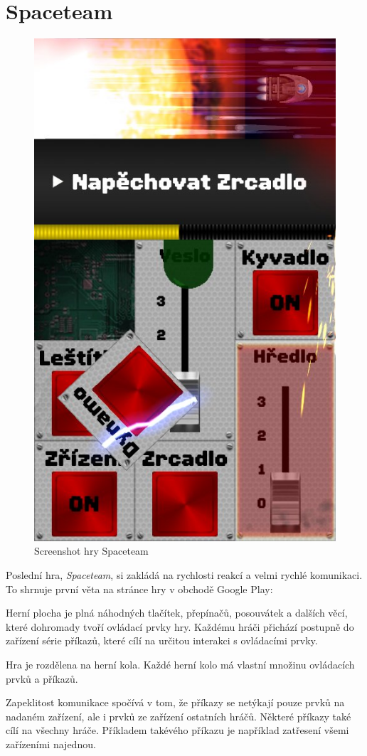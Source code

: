 \section{Spaceteam}

\begin{figure}
    \centering
    \includegraphics[width=0.5\linewidth]{assets/competitive-apps/spaceteam.jpg}
    \caption{Screenshot hry Spaceteam \cite{henrysmithinc_spaceteam}}
    \label{fig:spaceteam}
\end{figure}

Poslední hra, \emph{Spaceteam}, si zakládá na rychlosti reakcí a velmi rychlé
komunikaci.
To shrnuje první věta na stránce hry v obchodě Google Play:
\emph{}
\cite{henrysmithinc_spaceteam}

Herní plocha je plná náhodných tlačítek, přepínačů, posouvátek a dalších věcí,
které dohromady tvoří ovládací prvky hry.
Každému hráči přichází postupně do zařízení série příkazů,
které cílí na určitou interakci s ovládacími prvky.

Hra je rozdělena na herní kola.
Každé herní kolo má vlastní množinu ovládacích prvků a příkazů.

Zapeklitost komunikace spočívá v tom,
že příkazy se netýkají pouze prvků na nadaném zařízení,
ale i prvků ze zařízení ostatních hráčů.
Některé příkazy také cílí na všechny hráče.
Příkladem takévého příkazu je například zatřesení všemi zařízeními najednou.

